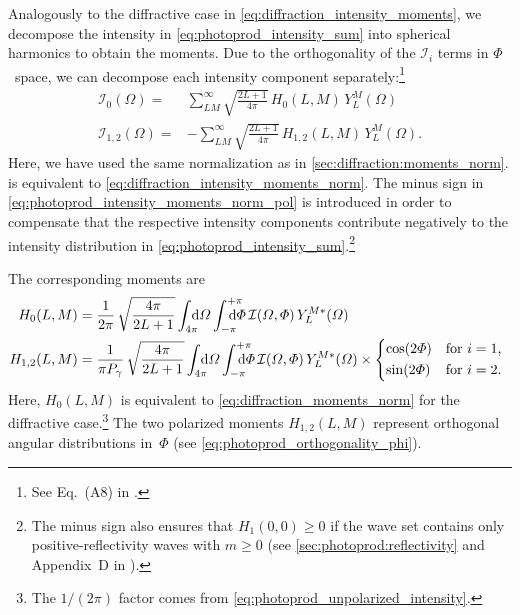 Analogously to the diffractive case in
\cref{eq:diffraction_intensity_moments}, we decompose the intensity in
\cref{eq:photoprod_intensity_sum} into spherical harmonics to obtain
the moments.  Due to the orthogonality of the $\mathcal{I}_i$ terms in
$\Phi$~space, we can decompose each intensity component
separately:\footnote{See Eq.~(A8) in .}
\begin{align}
  \label{eq:photoprod_intensity_moments_norm_unpol}
  \mathcal{I}_0(\Omega)
  ={}& \sum_{L M}^\infty \sqrt{\frac{2 L + 1}{4 \pi}}\, H_0(L, M)\, Y_L^M(\Omega)
  \\
  \label{eq:photoprod_intensity_moments_norm_pol}
  \mathcal{I}_{1, 2}(\Omega)
  ={}& -\sum_{L M}^\infty \sqrt{\frac{2 L + 1}{4 \pi}}\, H_{1, 2}(L, M)\, Y_L^M(\Omega).
\end{align}
Here, we have used the same normalization as in
\cref{sec:diffraction:moments_norm}.
 is equivalent to
\cref{eq:diffraction_intensity_moments_norm}.  The minus sign in
\cref{eq:photoprod_intensity_moments_norm_pol} is introduced in order
to compensate that the respective intensity components contribute
negatively to the intensity distribution in
\cref{eq:photoprod_intensity_sum}.\footnote{\label{fn:photoprod_intensity_sign}The
minus sign also ensures that $H_1(0, 0) \geq 0$ if the wave set
contains only positive-reflectivity waves with $m \geq 0$ (see
\cref{sec:photoprod:reflectivity} and Appendix~D in
).}

The corresponding moments are
\begin{align}
  \label{eq:photoprod_moment_norm_unpol}
  H_0(L, M)
  ={}& \frac{1}{2 \pi}\, \sqrt{\frac{4 \pi}{2 L + 1}} \int_{4 \pi}\!\!\!\! \dif{\Omega} \int_{-\pi}^{+\pi}\hspace{-1.2em} \dif{\Phi}\,
  \mathcal{I}(\Omega, \Phi)\, Y_L^{M *}(\Omega)
  \\
  \label{eq:photoprod_moments_norm_pol}
  H_{1, 2}(L, M)
  ={}& \frac{1}{\pi P_\gamma}\, \sqrt{\frac{4 \pi}{2 L + 1}} \int_{4 \pi}\!\!\!\! \dif{\Omega} \int_{-\pi}^{+\pi}\hspace{-1.2em} \dif{\Phi}\,
  \mathcal{I}(\Omega, \Phi)\, Y_L^{M *}(\Omega) \times \begin{cases*}
    \cos(2 \Phi) & for $i = 1$, \\
    \sin(2 \Phi) & for $i = 2$.
  \end{cases*}
\end{align}
Here, $H_0(L, M)$ is equivalent to \cref{eq:diffraction_moments_norm}
for the diffractive case.\footnote{The $1 / (2 \pi)$ factor comes from
\cref{eq:photoprod_unpolarized_intensity}.}  The two polarized moments
$H_{1, 2}(L, M)$ represent orthogonal angular distributions in~$\Phi$
(see \cref{eq:photoprod_orthogonality_phi}).


